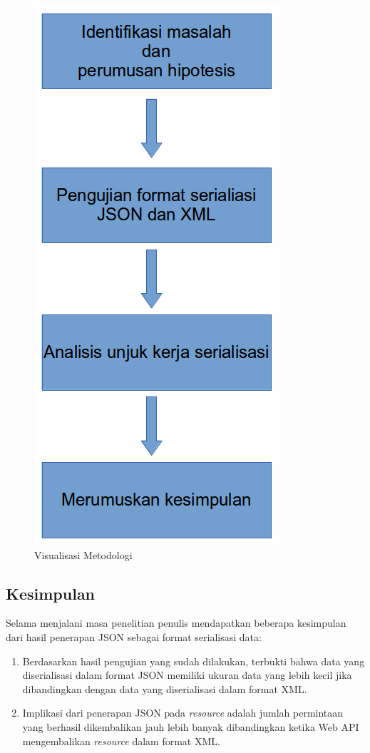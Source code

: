\documentclass{llncs}
\begin{document}
\onehalfspacing
\begin{figure}[htp]
\centering
\includegraphics[scale=0.45]{images/visualisasi-metodologi.png}
\caption{Visualisasi Metodologi}
\label{visualisasi-metodologi}
\end{figure}

\subsection{Kesimpulan}

Selama menjalani masa penelitian penulis mendapatkan beberapa kesimpulan dari hasil penerapan JSON sebagai format serialisasi data:

\begin{enumerate}
  \item Berdasarkan hasil pengujian yang sudah dilakukan, terbukti bahwa data yang diserialisasi dalam format JSON memiliki ukuran data yang lebih kecil jika dibandingkan dengan data yang diserialisasi dalam format XML.
  \item Implikasi dari penerapan JSON pada \textit{resource} adalah jumlah permintaan yang berhasil dikembalikan jauh lebih banyak dibandingkan ketika Web API mengembalikan \textit{resource} dalam format XML.
\end{enumerate}
\end{document}
